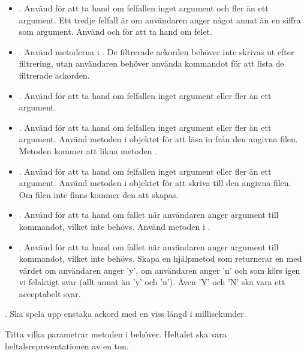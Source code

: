 {\begin{itemize}
\item {}. Använd  för att ta hand om felfallen inget argument och fler än ett argument. Ett tredje felfall är om användaren anger något annat än en siffra som argument. Använd  och  för att ta hand om felet.

\item {}. Använd metoderna i . De filtrerade ackorden behöver inte skrivas ut efter filtrering, utan användaren behöver använda kommandot  för att lista de filtrerade ackorden.

\item {}. Använd  för att ta hand om felfallen inget argument eller fler än ett argument.

\item {}. Använd  för att ta hand om felfallen inget argument eller fler än ett argument. Använd metoden  i objektet  för att läsa in från den angivna filen. Metoden kommer att likna metoden .

\item {}. Använd  för att ta hand om felfallen inget argument eller fler än ett argument. Använd metoden  i objektet  för att skriva till den angivna filen. Om filen inte finns kommer den att skapas.

\item {}. Använd  för att ta hand om fallet när användaren anger argument till kommandot, vilket inte behövs. Använd metoden i .

\item {}. Använd  för att ta hand om fallet när användaren anger argument till kommandot, vilket inte behövs. Skapa en hjälpmetod  som returnerar en  med värdet  om användaren anger 'y',  om användaren anger 'n' och som körs igen vi felaktigt svar (allt annat än 'y' och 'n'). Även 'Y' och 'N' ska vara ett acceptabelt svar.
\end{itemize}

\Task {}. Ska spela upp enstaka ackord  med en viss längd  i millisekunder.

\Subtask Titta vilka parametrar metoden  i  behöver. Heltalet  ska vara heltalsrepresentationen av en ton.

}
